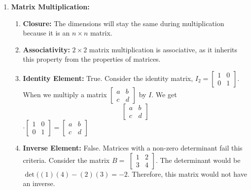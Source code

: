 {\begin{enumerate}
\begin{enumerate}[label=(\arabic*)]
              \end{enumerate}
        \item \textbf{Matrix Multiplication:} \xmark
              \begin{enumerate}[label=(\arabic*)]
                  \item \textbf{Closure:} The dimensions will stay the same during multiplication because it is an \(n \times n\) matrix.
                  \item \textbf{Associativity:} \(2 \times 2\) matrix multiplication is associative, as it inherits this property from the properties of matrices.
                  \item \textbf{Identity Element:} True. Consider the identity matrix, \(I_2 =
                        \begin{bmatrix}
                            1 & 0 \\
                            0 & 1
                        \end{bmatrix}\). When we multiply a matrix \(\begin{bmatrix}
                            a & b \\
                            c & d
                        \end{bmatrix}\) by \(I\). We get \[\begin{bmatrix}
                                a & b \\
                                c & d
                            \end{bmatrix}\] \(\cdot
                        \begin{bmatrix}
                            1 & 0 \\
                            0 & 1
                        \end{bmatrix} = \begin{bmatrix}
                            a & b \\
                            c & d
                        \end{bmatrix}\)
                  \item \textbf{Inverse Element:} False. Matrices with a non-zero determinant fail this criteria. Consider the matrix \(B =\)
                        \(\begin{bmatrix}
                            1 & 2 \\
                            3 & 4
                        \end{bmatrix}\). The determinant would be \(\det((1)(4) - (2)(3) = -2\). Therefore, this matrix would not have an inverse.
              \end{enumerate}
    \end{enumerate}
}


